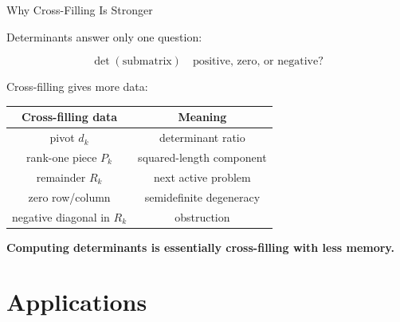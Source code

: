 \documentclass[10pt]{beamer}
\theoremstyle{definition}
\newcommand{\x}[1]{\alert{\textbf{#1}}}
\begin{document}
\begin{frame}{Why Cross-Filling Is Stronger}

Determinants answer only one question:

$$
\det(\text{submatrix})\quad \text{positive, zero, or negative?}
$$

\vfill

Cross-filling gives more data:

\begin{center}
\small
\renewcommand{\arraystretch}{1.15}
\begin{tabular}{c|c}
\textbf{Cross-filling data} & \textbf{Meaning}\\
\hline
pivot $d_k$ & determinant ratio\\
rank-one piece $P_k$ & squared-length component\\
remainder $R_k$ & next active problem\\
zero row/column & semidefinite degeneracy\\
negative diagonal in $R_k$ & obstruction
\end{tabular}
\end{center}

\vfill

\begin{center}
\x{Computing determinants is essentially cross-filling with less memory.}
\end{center}

\end{frame}


\section{Applications}
\end{document}
